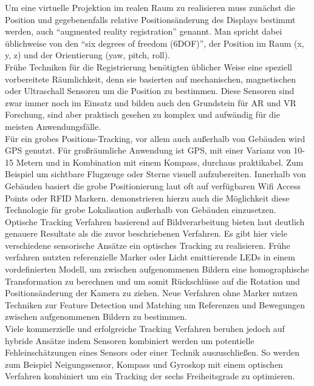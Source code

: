 Um eine virtuelle Projektion im realen Raum zu realisieren muss zunächst die Position und gegebenenfalls relative Positionsänderung des Displays bestimmt werden, auch \enquote{augmented reality registration} genannt. Man spricht dabei üblichweise von den \enquote{six degrees of freedom (6DOF)}, der Position im Raum (x, y, z) und der Orientierung (yaw, pitch, roll). \\

Frühe Techniken für die Registrierung benötigten üblicher Weise eine speziell vorbereitete Räumlichkeit, denn sie basierten auf mechanischen, magnetischen oder Ultraschall Sensoren um die Position zu bestimmen. Diese Sensoren sind zwar immer noch im Einsatz und bilden auch den Grundstein für AR und VR Forschung, sind aber praktisch gesehen zu komplex und aufwändig für die meisten Anwendungsfälle. \citep{van2010survey} \\

Für ein grobes Positions-Tracking, vor allem auch außerhalb von Gebäuden wird GPS genutzt. Für großräumliche Anwendung ist GPS, mit einer Varianz von 10-15 Metern und in Kombination mit einem Kompass, durchaus praktikabel. Zum Beispiel um sichtbare Flugzeuge oder Sterne visuell aufzubereiten. Innerhalb von Gebäuden basiert die grobe Positionierung laut \citet{van2010survey} oft auf verfügbaren Wifi Access Points oder RFID Markern. \citet{lamarca2005place} demonstrieren hierzu auch die Möglichkeit diese Technologie für grobe Lokalisation außerhalb von Gebäuden einzusetzen.\\

Optische Tracking Verfahren basierend auf Bildverarbeitung bieten laut \citet{van2010survey} deutlich genauere Resultate als die zuvor beschriebenen Verfahren. Es gibt hier viele verschiedene sensorische Ansätze ein optisches Tracking zu realisieren. Frühe verfahren nutzten referenzielle Marker oder Licht emittierende LEDs in einem vordefinierten Modell, um zwischen aufgenommenen Bildern eine homographische Transformation zu berechnen und um somit Rückschlüsse auf die Rotation und Positionsänderung der Kamera zu ziehen. Neue Verfahren ohne Marker nutzen Techniken zur Feature Detection und Matching um Referenzen und Bewegungen zwischen aufgenommenen Bildern zu bestimmen.\\

Viele kommerzielle und erfolgreiche Tracking Verfahren beruhen jedoch auf hybride Ansätze indem Sensoren kombiniert werden um potentielle Fehleinschätzungen eines Sensors oder einer Technik auszuschließen. So werden zum Beispiel Neigungssensor, Kompass und Gyroskop mit einem optischen Verfahren kombiniert um ein Tracking der sechs Freiheitsgrade zu optimieren. \citep{van2010survey}\\

